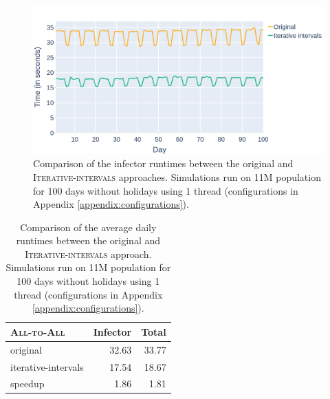 \begin{figure}
    \centering
    \includegraphics[width=\textwidth]{4 - Sampling/fig/iterative_intervals/ii_vs_standard_infector.png}
    \caption{Comparison of the infector runtimes between the original and \textsc{Iterative-intervals} approaches. Simulations run on 11M population for 100 days without holidays using 1 thread (configurations in Appendix \ref{appendix:configurations}).}
    \label{fig:ii_vs_standard_infector}
\end{figure}

\begin{table}
    \centering
    \begin{tabular}{@{}lrr@{}}
        \toprule
        \textsc{All-to-All} & Infector & Total \\ \midrule
        original & 32.63 & 33.77 \\
        iterative-intervals & 17.54 & 18.67 \\ \hdashline[1pt/1pt]
        speedup & 1.86 & 1.81 \\ \bottomrule
    \end{tabular}
    \caption{Comparison of the average daily runtimes between the original and \textsc{Iterative-intervals} approach. Simulations run on 11M population for 100 days without holidays using 1 thread (configurations in Appendix \ref{appendix:configurations}).}
    \label{tab:ii_vs_standard_runtimes}
\end{table}

